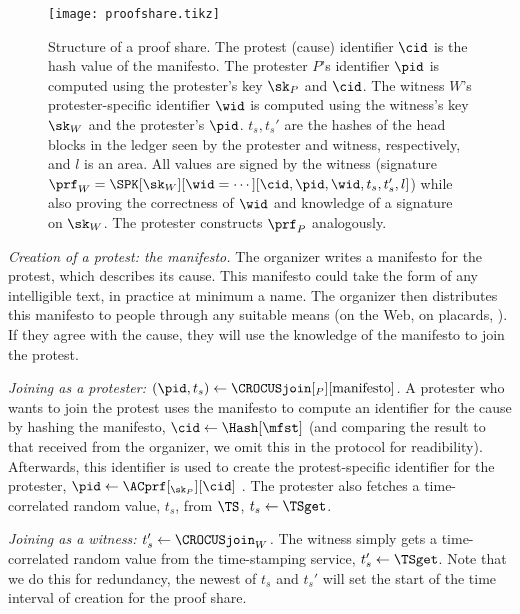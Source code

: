 \begin{figure}
  \centering
  \small
  \texttt{[image: proofshare.tikz]}
  \caption{%
    Structure of a proof share.
    The protest (cause) identifier \(\cid\) is the hash value of the manifesto.
    The protester \(P\)'s identifier \(\pid\) is computed using the protester's key \(\sk_P\) and \(\cid\).
    The witness \(W\)'s protester-specific identifier \(\wid\) is computed using the
    witness's key \(\sk_W\) and the protester's \(\pid\).
    \(t_s, t_s'\) are the hashes of the head blocks in the ledger seen by the 
    protester and witness, respectively, and \(l\) is an area.
    All values are signed by the witness (signature \(\prf_W = \SPK[\sk_W][\wid 
      = \dotsb][\cid, \pid, \wid, t_s, t_s', l]\)) while also proving the 
    correctness of \(\wid\) and knowledge of a signature on \(\sk_W\).
    The protester constructs \(\prf_P\) analogously.
  }%
  \label{fig:ProofFig}
\end{figure}%


\emph{Creation of a protest: the manifesto.}
The organizer writes a manifesto for the protest, which describes its cause.
This manifesto could take the form of any intelligible text, in
practice at minimum a name.
The organizer then distributes this manifesto to people through
any suitable means  (\eg on the Web, on placards, \etc).
If they agree with the cause, they will use the knowledge of the
manifesto to join the protest. 


\emph{Joining as a protester: \((\pid, t_s)\gets 
    \CROCUSjoin[_P][\text{manifesto}]\).}
A protester who wants to join the protest uses the manifesto to
compute an identifier for the cause by hashing the manifesto,
\(\cid\gets \Hash[\mfst]\) (and comparing the result to that received
from the organizer, we omit this in the protocol for readibility).
Afterwards, this identifier is used to create the protest-specific identifier 
for the protester, \(\pid\gets \ACprf[_{\sk_P}][\cid]\)%
.
The protester also fetches a time-correlated random value, \(t_s\), from 
\(\TS\), \(t_s\gets \TSget\).


\emph{Joining as a witness: \(t_s'\gets \CROCUSjoin_W\).}
The witness simply gets a time-correlated random value from the time-stamping service, \(t_s'\gets \TSget\).
Note that we do this for redundancy, the newest of \(t_s\) and \(t_s'\) will 
set the start of the time interval of creation for the proof share.



